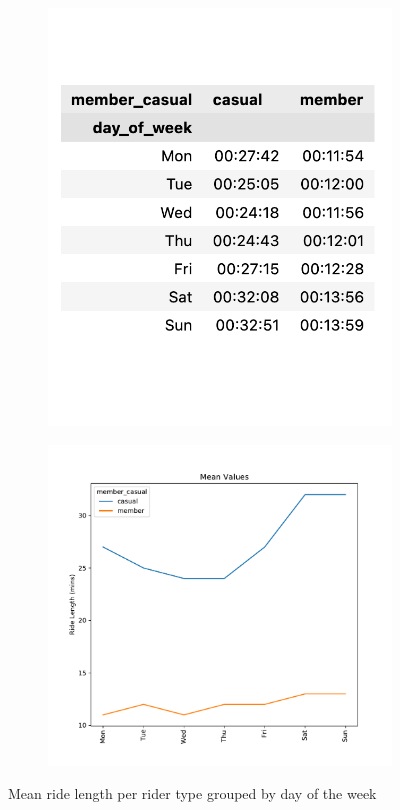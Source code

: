\documentclass[12pt]{article}
\begin{document}
	\begin{figure}[h]
	\hspace{0.8in}
	\begin{subfigure}{.2\textwidth}
		\includegraphics[scale=0.6]{dayofweek_t.png} 
		\caption{}
		\label{fig14_1}
	\end{subfigure}
	\begin{subfigure}{.55\textwidth}
	\hspace{1.2in}
		\includegraphics[scale=0.48]{mean_cvsm_dayofweek.pdf} 
		\caption{}
		\label{fig14_2}
	\end{subfigure}
	\caption{Mean ride length per rider type grouped by day of the week}
	\label{fig14}
	\end{figure}
	\pagebreak
\end{document}
